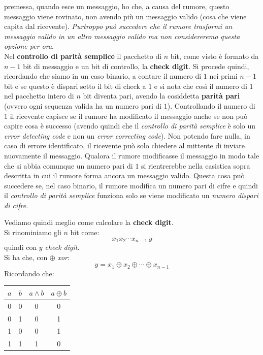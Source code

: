 \documentclass[a4paper,12pt, oneside]{book}
\begin{document}
\begin{definizione}
  premessa, quando esce un messaggio, ho che, a causa del rumore, questo
  messaggio viene rovinato, non avendo più un messaggio
  valido (cosa che viene capita dal ricevente). \textit{Purtroppo può succedere
    che il rumore trasformi un messaggio valido in un altro messaggio valido ma
    non considereremo questa opzione per ora}. \\
  Nel \textbf{controllo di parità semplice} il pacchetto di $n$ bit, come visto
  è formato da $n-1$ bit di messaggio e un bit di controllo, la \textbf{check
    digit}. Si procede quindi, ricordando che siamo in un caso binario, a
  contare il numero di $1$ nei primi $n-1$ bit e se questo è dispari setto il
  bit di check a $1$ e si nota che così il numero di $1$ nel pacchetto intero
  di $n$ bit diventa pari, avendo la cosiddetta \textbf{parità pari} (ovvero
  ogni sequenza valida ha un numero pari di $1$). Controllando il numero di $1$
  il ricevente capisce se il rumore ha modificato il messaggio anche se non può
  capire cosa è successo (avendo quindi che il \emph{controllo di parità
    semplice} è solo un \emph{error detecting code} e non un \emph{error
    correcting code}). Non potendo fare nulla, in caso di errore identificato,
  il ricevente può solo chiedere al mittente di inviare nuovamente il messaggio.
  Qualora il rumore modificasse il messaggio in modo tale che si abbia comunque
  un numero pari di $1$ si rientrerebbe nella casistica sopra descritta in cui
  il rumore forma ancora un messaggio valido. Questa cosa può succedere se, nel
  caso binario, il rumore modifica un numero pari di cifre e quindi il
  \emph{controllo di parità semplice} funziona solo se viene modificato un
  \emph{numero dispari di cifre}.
  
\end{definizione}
Vediamo quindi meglio come calcolare la \textbf{check digit}.\\
Si rinominiamo gli $n$ bit come:
\[x_1x_2\cdots x_{n-1}\,y\]
quindi con $y$ \textit{check digit}.\\
Si ha che, con $\oplus$ \textit{xor}:
\[y=x_1\oplus x_2\oplus\cdots\oplus x_{n-1}\]
Ricordando che:
\begin{table}[H]
  \centering
  \begin{tabular}{c|c|c|c}
    $a$& $b$ & $a\land b$& $a\oplus b$\\
    \hline
    0 & 0 & 0 &0\\
    0 & 1 & 0 & 1\\
    1 & 0 & 0 &1\\
    1 & 1 & 1 & 0\\    
  \end{tabular}
\end{table}
\end{document}
